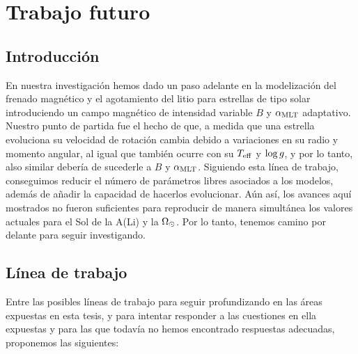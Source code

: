 \chapter{Trabajo futuro}\label{ch:decimo-capitulo}
\section{Introducción}
En nuestra investigación hemos dado un paso adelante en la modelización del frenado magnético y el agotamiento del litio para estrellas de tipo solar introduciendo un campo magnético de intensidad variable $B$ y $\alpha_{\mathrm{MLT}}$ adaptativo. Nuestro punto de partida fue el hecho de que, a medida que una estrella evoluciona su velocidad de rotación cambia debido a variaciones en su radio y momento angular, al igual que también ocurre con su $T_{\mathrm{eff}}$ y $\mathrm{log} \, g$, y por lo tanto, also similar debería de sucederle a $B$ y $\alpha_{\mathrm{MLT}}$. Siguiendo esta línea de trabajo, conseguimos reducir el número de parámetros libres asociados a los modelos, además de añadir la capacidad de hacerlos evolucionar. Aún así, los avances aquí mostrados no fueron suficientes para reproducir de manera simultánea los valores actuales para el Sol de la A(Li) y la $\Omega_\odot$. Por lo tanto, tenemos camino por delante para seguir investigando. 

\section{Línea de trabajo}
Entre las posibles líneas de trabajo para seguir profundizando en las áreas expuestas en esta tesis, y para intentar responder a las cuestiones en ella expuestas y para las que todavía no hemos encontrado respuestas adecuadas, proponemos las siguientes:

